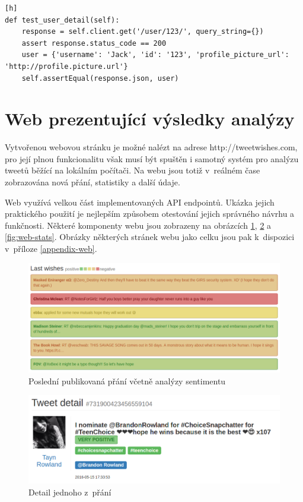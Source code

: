 \documentclass[thesis=B,czech]{FITthesis}[2012/06/26]
\begin{document}
\begin{lstlisting}[caption={Test endpointu /user/<user\_id>},label=user-test][h]
def test_user_detail(self):
	response = self.client.get('/user/123/', query_string={})
	assert response.status_code == 200
	user = {'username': 'Jack', 'id': '123', 'profile_picture_url': 'http://profile.picture.url'}
	self.assertEqual(response.json, user)
\end{lstlisting}


\section{Web prezentující výsledky analýzy}
Vytvořenou webovou stránku je možné nalézt na adrese http://tweetwishes.com, pro její plnou funkcionalitu však musí být spuštěn i samotný systém pro analýzu tweetů běžící na lokálním počítači. Na webu jsou totiž v~reálném čase zobrazována nová přání, statistiky a další údaje. 

Web využívá velkou část implementovaných API endpointů. Ukázka jejich praktického použití je nejlepším způsobem otestování jejich správného návrhu a funkčnosti. Některé komponenty webu jsou zobrazeny na obrázcích \ref{fig:web-last-tweets}, \ref{fig:web-detail} a \ref{fig:web-stats}. Obrázky některých stránek webu jako celku jsou pak k~dispozici v~příloze \ref{appendix-web}. 

	\begin{figure}[ht]
    	\centering
    	\includegraphics[width=1\textwidth]{images/web-wishes.png}
    	\caption{Poslední publikovaná přání včetně analýzy sentimentu}
    	\label{fig:web-last-tweets}
	\end{figure}

	\begin{figure}[ht]
    	\centering
    	\includegraphics[width=1\textwidth]{images/web-detail.png}
    	\caption{Detail jednoho z~přání}
    	\label{fig:web-detail}
	\end{figure}
	
\end{document}
